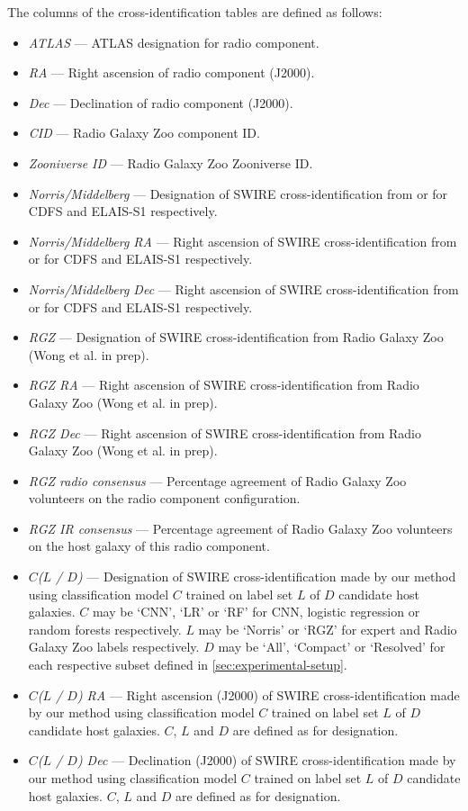   The columns of the cross-identification tables are defined as follows:
  \begin{itemize}
    \item \emph{ATLAS} --- ATLAS designation for radio component.
    \item \emph{RA} --- Right ascension of radio component (J2000).
    \item \emph{Dec} --- Declination of radio component (J2000).
    \item \emph{CID} --- Radio Galaxy Zoo component ID.
    \item \emph{Zooniverse ID} --- Radio Galaxy Zoo Zooniverse ID.
    \item \emph{Norris/Middelberg} --- Designation of SWIRE cross-identification from \citet{norris06} or \citet{middelberg08} for CDFS and ELAIS-S1 respectively.
    \item \emph{Norris/Middelberg RA} --- Right ascension of SWIRE cross-identification from \citet{norris06} or \citet{middelberg08} for CDFS and ELAIS-S1 respectively.
    \item \emph{Norris/Middelberg Dec} --- Right ascension of SWIRE cross-identification from \citet{norris06} or \citet{middelberg08} for CDFS and ELAIS-S1 respectively.
    \item \emph{RGZ} --- Designation of SWIRE cross-identification from Radio Galaxy Zoo (Wong et al. in prep).
    \item \emph{RGZ RA} --- Right ascension of SWIRE cross-identification from Radio Galaxy Zoo (Wong et al. in prep).
    \item \emph{RGZ Dec} --- Right ascension of SWIRE cross-identification from Radio Galaxy Zoo (Wong et al. in prep).
    \item \emph{RGZ radio consensus} --- Percentage agreement of Radio Galaxy Zoo volunteers on the radio component configuration.
    \item \emph{RGZ IR consensus} --- Percentage agreement of Radio Galaxy Zoo volunteers on the host galaxy of this radio component.
    \item \emph{$C$($L$ / $D$)} --- Designation of SWIRE cross-identification made by our method using classification model $C$ trained on label set $L$ of $D$ candidate host galaxies. $C$ may be `CNN', `LR' or `RF' for CNN, logistic regression or random forests respectively. $L$ may be `Norris' or `RGZ' for expert and Radio Galaxy Zoo labels respectively. $D$ may be `All', `Compact' or `Resolved' for each respective subset defined in \autoref{sec:experimental-setup}.
    \item \emph{$C$($L$ / $D$) RA} --- Right ascension (J2000) of SWIRE cross-identification made by our method using classification model $C$ trained on label set $L$ of $D$ candidate host galaxies. $C$, $L$ and $D$ are defined as for designation.
    \item \emph{$C$($L$ / $D$) Dec} --- Declination (J2000) of SWIRE cross-identification made by our method using classification model $C$ trained on label set $L$ of $D$ candidate host galaxies. $C$, $L$ and $D$ are defined as for designation.
  \end{itemize}

